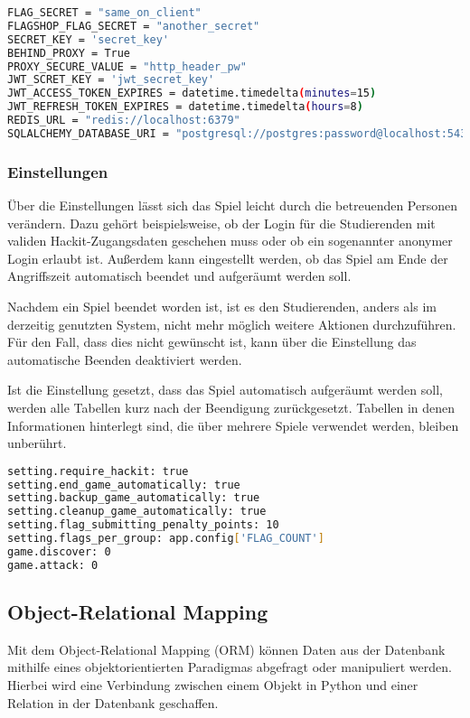 \begin{lstlisting}[language=bash, frame=single, caption={GIS Auszug aus der Konfiguration}, captionpos=b, label={lst:gis-config}]
FLAG_SECRET = "same_on_client"
FLAGSHOP_FLAG_SECRET = "another_secret"
SECRET_KEY = 'secret_key'
BEHIND_PROXY = True
PROXY_SECURE_VALUE = "http_header_pw"
JWT_SCRET_KEY = 'jwt_secret_key'
JWT_ACCESS_TOKEN_EXPIRES = datetime.timedelta(minutes=15)
JWT_REFRESH_TOKEN_EXPIRES = datetime.timedelta(hours=8)
REDIS_URL = "redis://localhost:6379"
SQLALCHEMY_DATABASE_URI = "postgresql://postgres:password@localhost:5432/postgres"
\end{lstlisting}

\subsubsection{Einstellungen} \label{subsub:realisierung-settings}
Über die Einstellungen lässt sich das Spiel leicht durch die betreuenden Personen verändern.
Dazu gehört beispielsweise, ob der Login für die Studierenden mit validen Hackit-Zugangsdaten geschehen muss oder ob ein sogenannter anonymer Login erlaubt ist. Außerdem kann eingestellt werden, ob das Spiel am Ende der Angriffszeit automatisch beendet und aufgeräumt werden soll. 

Nachdem ein Spiel beendet worden ist, ist es den Studierenden, anders als im derzeitig genutzten System, nicht mehr möglich weitere Aktionen durchzuführen. Für den Fall, dass dies nicht gewünscht ist, kann über die Einstellung das automatische Beenden deaktiviert werden.

Ist die Einstellung gesetzt, dass das Spiel automatisch aufgeräumt werden soll, werden alle Tabellen kurz nach der Beendigung zurückgesetzt. Tabellen in denen Informationen hinterlegt sind, die über mehrere Spiele verwendet werden, bleiben unberührt.

\begin{lstlisting}[language=bash, frame=single, caption={GIS Auszug aus den Einstellungen}, captionpos=b, label={lst:gis-settings}]
setting.require_hackit: true
setting.end_game_automatically: true
setting.backup_game_automatically: true
setting.cleanup_game_automatically: true
setting.flag_submitting_penalty_points: 10
setting.flags_per_group: app.config['FLAG_COUNT']
game.discover: 0
game.attack: 0
\end{lstlisting}

\subsection{Object-Relational Mapping}
Mit dem Object-Relational Mapping (ORM) können Daten aus der Datenbank mithilfe eines objektorientierten Paradigmas abgefragt oder manipuliert werden. Hierbei wird eine Verbindung zwischen einem Objekt in Python und einer Relation in der Datenbank geschaffen.

